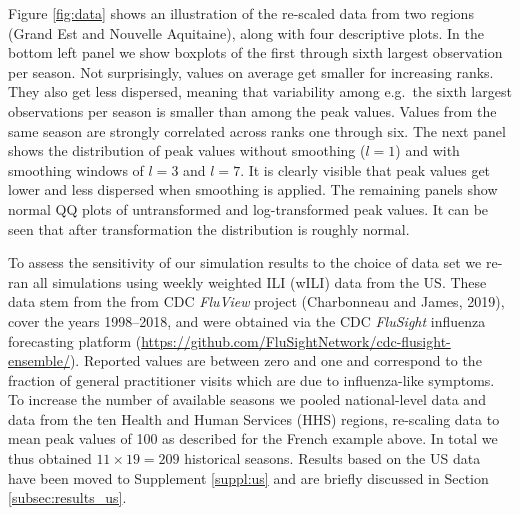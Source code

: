 \documentclass[12pt]{article}
\begin{document}
Figure \ref{fig:data} shows an illustration of the re-scaled data from two regions (Grand Est and Nouvelle Aquitaine), along with four descriptive plots. In the bottom left panel we show boxplots of the first through sixth largest observation per season. Not surprisingly, values on average get smaller for increasing ranks. They also get less dispersed, meaning that variability among e.g.\ the sixth largest observations per season is smaller than among the peak values. Values from the same season are strongly correlated across ranks one through six. The next panel shows the distribution of peak values without smoothing ($l = 1$) and with smoothing windows of $l = 3$ and $l = 7$. It is clearly visible that peak values get lower and less dispersed when smoothing is applied. The remaining panels show normal QQ plots of untransformed and log-transformed peak values. It can be seen that after transformation the distribution is roughly normal.

To assess the sensitivity of our simulation results to the choice of data set we re-ran all simulations using  weekly weighted ILI (wILI) data from the US. These data stem from the from CDC \textit{FluView} project (Charbonneau and James, 2019), cover the years 1998–2018, and were
obtained via the CDC \textit{FluSight} influenza forecasting platform (\url{https://github.com/FluSightNetwork/cdc-flusight-ensemble/}). Reported values are between zero and one and correspond to the fraction of general practitioner visits which are due to influenza-like symptoms. To increase the number of available seasons we pooled national-level data and data from the ten Health and Human Services (HHS) regions, re-scaling data to mean peak values of 100 as described for the French example above. In total we thus obtained $11 \times 19 = 209$ historical seasons. Results based on the US data have been moved to Supplement \ref{suppl:us} and are briefly discussed in Section \ref{subsec:results_us}.

\end{document}
